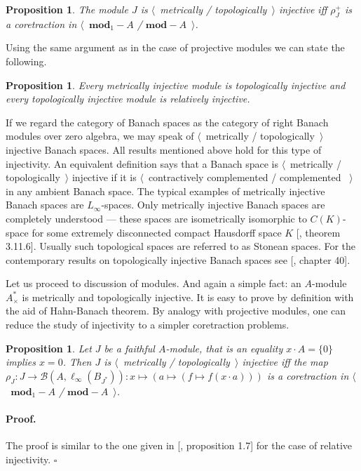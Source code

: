 \documentclass[12pt]{article}
\newtheorem{proposition}[theorem]{Proposition}
\renewenvironment{proof}{\paragraph{Proof.}}{\hfill$\square$\medskip}
\begin{document}
\begin{proposition}\label{MetTopInjModViaCanonicMorph}
The module $J$ is $\langle$~metrically / topologically~$\rangle$ injective iff $\rho_J^+$ is a coretraction in $\langle$~$\mathbf{mod}_1-A$ / $\mathbf{mod}-A$~$\rangle$.
\end{proposition}

Using the same argument as in the case of projective modules we can state the following.

\begin{proposition}\label{MetInjIsTopInjAndTopInjIsRelInj} Every metrically injective module is topologically injective and every topologically injective module is relatively injective.
\end{proposition}

If we regard the category of Banach spaces as the category of right Banach modules over zero algebra, we may speak of $\langle$~metrically / topologically~$\rangle$ injective Banach spaces. All results mentioned above hold for this type of injectivity. An equivalent definition says that a Banach space is $\langle$~metrically / topologically~$\rangle$ injective if it is $\langle$~contractively complemented / complemented ~$\rangle$ in any ambient Banach space. The typical examples of metrically injective Banach spaces are $L_\infty$-spaces. Only metrically injective Banach spaces are completely understood --- these spaces are isometrically isomorphic to $C(K)$-space for some extremely disconnected compact Hausdorff space $K$ [\cite{LaceyIsomThOfClassicBanSp}, theorem 3.11.6]. Usually such topological spaces are referred to as Stonean spaces.  For the contemporary results on topologically injective Banach spaces see [\cite{JohnLinHandbookGeomBanSp}, chapter 40].

Let us proceed to discussion of modules. And again a simple fact: an $A$-module $A_\times^*$ is metrically and topologically injective. It is easy to prove by definition with the aid of Hahn-Banach theorem. By analogy with projective modules, one can reduce the study of injectivity to a simpler coretraction problems.

\begin{proposition}\label{NonDegenMetTopInjCharac}  Let $J$ be a faithful $A$-module, that is an equality $x\cdot A=\{0\}$ implies $x=0$. Then $J$ is $\langle$~metrically / topologically~$\rangle$ injective iff the map $\rho_J:J\to\mathcal{B}(A,\ell_\infty(B_{J^*})):x\mapsto(a\mapsto(f\mapsto f(x\cdot a)))$ is a coretraction in $\langle$~$\mathbf{mod}_1-A$ / $\mathbf{mod}-A$~$\rangle$.
\end{proposition} 
\begin{proof} The proof is similar to the one given in [\cite{DalPolHomolPropGrAlg}, proposition 1.7] for the case of relative injectivity.
\end{proof}
\end{document}
